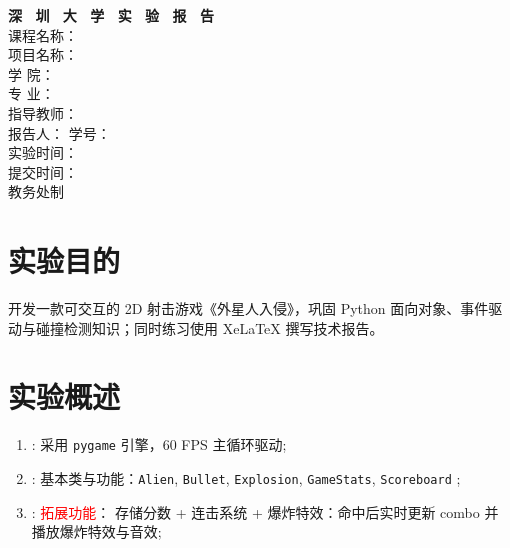 \documentclass[a4paper,12pt]{article}
\begin{document}
\begin{titlepage}
    \centering
    \vspace*{2cm}
    \Huge{\textbf{深 \ 圳 \ 大 \ 学 \ 实 \ 验  \ 报 \ 告}}\\[1.5cm]
    
    \Large{课程名称：\underline{}}\\[0.5cm]
    \Large{项目名称：\underline{}}\\[0.5cm]
    \Large{学 \quad \quad 院：\underline{}}\\[0.5cm]
    \Large{专 \quad \quad 业：\underline{}}\\[0.5cm]
    \Large{指导教师：\underline{}}\\[0.5cm]
 \Large
报告人：\underline{}%
\hspace{0.5cm}%
学号：\underline{}\\[0.5cm]
    \Large{实验时间：\underline{}}\\[0.5cm]
    \Large{提交时间：\underline{}}\\[1.5cm]

    \vfill
    \Large{教务处制}
\end{titlepage}

\newpage



\section{实验目的}


{开发一款可交互的 2D 射击游戏《外星人入侵》，巩固 Python 面向对象、事件驱动与碰撞检测知识；同时练习使用 XeLaTeX 撰写技术报告。}


\section{实验概述}
\begin{enumerate}
    \item[Spot 1]: 采用 \texttt{pygame} 引擎，60 FPS 主循环驱动;
    \item[Spot 2]: 基本类与功能：\texttt{Alien}, \texttt{Bullet}, \texttt{Explosion}, \texttt{GameStats}, \texttt{Scoreboard} ;
    \item[Spot 3]: \textcolor{red} {拓展功能}： 存储分数 + 连击系统 + 爆炸特效：命中后实时更新 combo 并播放爆炸特效与音效;
\end{enumerate}
\end{document}
